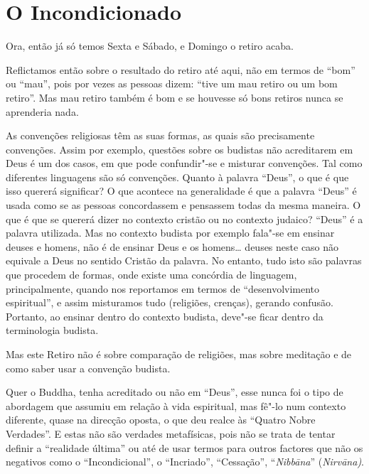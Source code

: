 \chapter{O Incondicionado}

Ora, então já só temos Sexta e Sábado, e Domingo o retiro acaba.

Reflictamos então sobre o resultado do retiro até aqui, não em termos de
``bom'' ou ``mau'', pois por vezes as pessoas dizem: ``tive um mau
retiro ou um bom retiro''. Mas mau retiro também é bom e se houvesse só
bons retiros nunca se aprenderia nada.

As convenções religiosas têm as suas formas, as quais são precisamente
convenções. Assim por exemplo, questões sobre os budistas não
acreditarem em Deus é um dos casos, em que pode confundir"-se e misturar
convenções. Tal como diferentes linguagens são só convenções. Quanto à
palavra ``Deus'', o que é que isso quererá significar? O que acontece na
generalidade é que a palavra ``Deus'' é usada como se as pessoas
concordassem e pensassem todas da mesma maneira. O que é que se quererá
dizer no contexto cristão ou no contexto judaico? ``Deus'' é a palavra
utilizada. Mas no contexto budista por exemplo fala"-se em ensinar deuses
e homens, não é de ensinar Deus e os homens\ldots{} deuses neste caso não
equivale a Deus no sentido Cristão da palavra. No entanto, tudo isto são
palavras que procedem de formas, onde existe uma concórdia de linguagem,
principalmente, quando nos reportamos em termos de ``desenvolvimento
espiritual'', e assim misturamos tudo (religiões, crenças), gerando
confusão. Portanto, ao ensinar dentro do contexto budista, deve"-se ficar
dentro da terminologia budista.

Mas este Retiro não é sobre comparação de religiões, mas sobre meditação
e de como saber usar a convenção budista.

Quer o Buddha, tenha acreditado ou não em ``Deus'', esse nunca foi o
tipo de abordagem que assumiu em relação à vida espiritual, mas fê"-lo
num contexto diferente, quase na direcção oposta, o que deu realce às
``Quatro Nobre Verdades''. E estas não são verdades metafísicas, pois
não se trata de tentar definir a ``realidade última'' ou até de usar
termos para outros factores que não os negativos como o
``Incondicional'', o ``Incriado'', ``Cessação'', ``\emph{Nibbāna}''
(\emph{Nirvāna)}.

